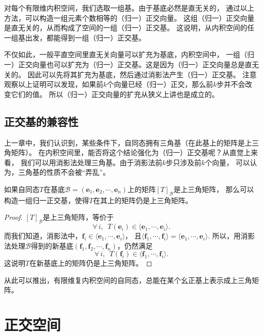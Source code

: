 \documentclass[12pt,UTF8]{ctexbook}
\begin{document}
对每个有限维内积空间，我们选取一组基。由于基底必然是直无关的，
通过以上方法，可以构造一组元素个数相等的（归一）正交向量。
这组（归一）正交向量是直无关的，从而构成了空间的一组（归一）正交基。
这说明，从内积空间的任一组基出发，都能得到一组（归一）正交基。

不仅如此，一般平直空间里直无关向量可以扩充为基底，内积空间中，
一组（归一）正交向量也可以扩充为（归一）正交基。这是因为（归一）正交向量总是直无关的。
因此可以先将其扩充为基底，然后通过消影法产生（归一）正交基。
注意观察以上证明可以发现，如果前$k$个向量已经（归一）正交，那么前$k$步并不会改变它们的值。
所以（归一）正交向量的扩充从狭义上讲也是成立的。

\subsection{正交基的兼容性}
上一章中，我们认识到，某些条件下，自同态拥有三角基（在此基上的矩阵是上三角矩阵）。
在内积空间里，能否将这个结论强化为（归一）正交基呢？从直觉上来看，
我们可以用消影法处理三角基。由于消影法前$k$步只涉及前$k$个向量，
可以认为，三角基的性质不会被“弄乱”。

\begin{pp}\label{pp:7_6}
    如果自同态$T$在基底$\mathcal{B} = (\mathbf{e}_1, \mathbf{e}_2, \cdots , \mathbf{e}_n)$上的矩阵$[T]_\mathcal{B}$是上三角矩阵，
    那么可以构造一组归一正交基，使得$T$在其上的矩阵仍是上三角矩阵。
\end{pp}

\begin{proof} %
    $[T]_\mathcal{B}$是上三角矩阵，等价于
    $$\forall \, i, \,\,\, T(\mathbf{e}_i) \in \langle \mathbf{e}_1, \cdots , \mathbf{e}_i \rangle.$$ 
    而我们知道，消影法中，$\mathbf{f}_i \in \langle \mathbf{e}_1, \cdots , \mathbf{e}_i \rangle$，
    且$\langle \mathbf{f}_1, \cdots , \mathbf{f}_i \rangle = \langle \mathbf{e}_1, \cdots , \mathbf{e}_i \rangle.$ 
    所以，用消影法处理$\mathcal{B}$得到的新基底$(\mathbf{f}_1, \mathbf{f}_2, \cdots , \mathbf{f}_n)$，仍然满足
    $$\forall \, i, \,\,\, T(\mathbf{f}_i) \in \langle \mathbf{f}_1, \cdots , \mathbf{f}_i \rangle.$$
    这说明$T$在新基底上的矩阵仍是上三角矩阵。

\end{proof}


从此可以推出，有限维复内积空间的自同态，总能在某个幺正基上表示成上三角矩阵。

\section{正交空间}
\end{document}
